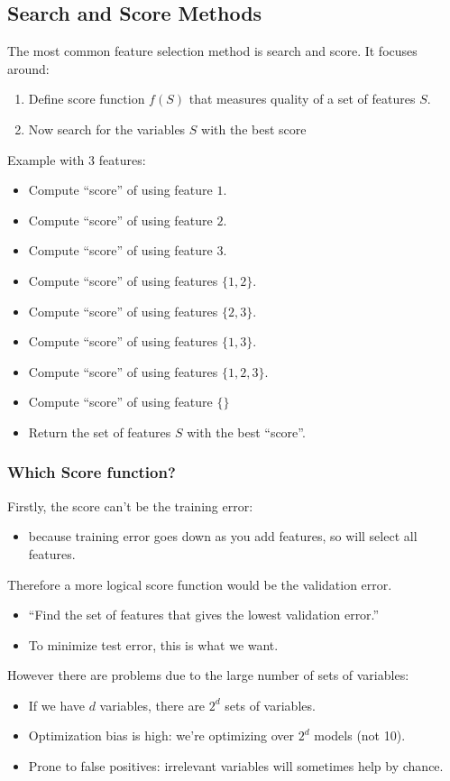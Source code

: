 \documentclass{article}
\def\blu#1{{\color{blu}#1}}
\def\gre#1{{\color{gre}#1}}
\def\red#1{{\color{red}#1}}
\begin{document}
\subsection*{Search and Score Methods}
The most common feature selection method is \blu{search and score}. It focuses around:
\begin{enumerate}
	\item Define \blu{score function $ f(S) $} that measures quality of a set of features $ S $.
	\item Now \blu{search} for the variables $ S $ with the best score
\end{enumerate}
Example with 3 features:
\begin{itemize} [label = -]
	
	\item Compute “score” of using feature $ 1 $. 
	\item Compute “score” of using feature $ 2 $. 
	\item Compute “score” of using feature $ 3 $. 
	\item Compute “score” of using features $ \{1,2\} $. 
	\item Compute “score” of using features $ \{2,3\} $.
	\item Compute “score” of using features $ \{1,3\} $.
	\item Compute “score” of using features $ \{1,2, 3\} $.
	\item Compute “score” of using feature $ \{ \} $
	\item Return the set of features $ S $ with the best “score”.
\end{itemize}

\subsubsection*{Which Score function?}
Firstly, the \red{score can’t be the training error}:
\begin{itemize}[label = -]
	\item because training error goes down as you add features, so will \red{select all features}.
\end{itemize}
Therefore a more logical score function would be the \blu{validation error}. 
\begin{itemize}[label = -]
	\item “\gre{Find the set of features that gives the lowest validation error.}” 
	\item To minimize test error, this is what we want.
\end{itemize}
However there are problems due to the large \red{number of sets of variables}:
\begin{itemize}[label = -]
	\item If we have $ d $ variables, there are \red{$ 2^d $ sets} of variables.
	\item \red{Optimization bias} is high: we’re optimizing over $ 2^d $ models (not 10).
	\item Prone to \red{false positives}: irrelevant variables will sometimes help by chance.
\end{itemize}
\end{document}
